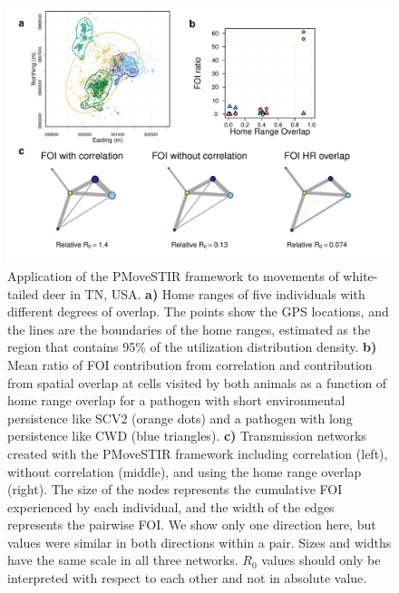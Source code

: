 \documentclass[letterpaper]{article}
\begin{document}
\begin{figure}
    \includegraphics[width=\textwidth]{figures/deer_results.pdf}
    \caption{\small Application of the PMoveSTIR framework to movements of white-tailed deer in TN, USA. \textbf{a)} Home ranges of five individuals with different degrees of overlap. The points show the GPS locations, and the lines are the boundaries of the home ranges, estimated as the region that contains 95\% of the utilization distribution density. %
\textbf{b)} Mean ratio of FOI contribution from correlation and contribution from spatial overlap at cells visited by both animals as a function of home range overlap for a pathogen with short environmental persistence like SCV2 (orange dots) and a pathogen with long persistence like CWD (blue triangles). \textbf{c)} Transmission networks created with the PMoveSTIR framework including correlation (left), without correlation (middle), and using the home range overlap (right). The size of the nodes represents the cumulative FOI experienced by each individual, and the width of the edges represents the pairwise FOI. We show only one direction here, but values were similar in both directions within a pair. Sizes and widths have the same scale in all three networks. $R_0$ values should only be interpreted with respect to each other and not in absolute value.}
  \label{fig:empiricalres}
\end{figure}
\end{document}
